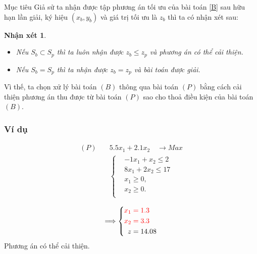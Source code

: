 \documentclass[12pt,a4paper]{report}
\newtheorem{nx}{Nhận xét}
\begin{document}
{Mục tiêu} %
Giả sử ta nhận được tập phương án tối ưu của bài toán \eqref{B} sau hữu hạn lần giải, ký hiệu $(x_b, y_b)$ và giá trị tối ưu là $z_b$ thì ta có nhận xét sau:
\begin{nx} \label{nx}
\phantom{abc}
\begin{itemize}
\item Nếu $S_b \subset S_p$ thì ta luôn nhận được $z_b \leq z_p$ và phương án có thể cải thiện.
\item Nếu $S_b = S_p$ thì ta nhận được $z_b = z_p$ và bài toán được giải.
\end{itemize}    
\end{nx}
Vì thế, ta chọn xử lý bài toán $(B)$ thông qua bài toán $(P)$ bằng cách cải thiện phương án thu được từ bài toán $(P)$ sao cho thoả điều kiện của bài toán $(B)$.


\subsubsection*{Ví dụ}
        \begin{equation*}
        \begin{split}
            (P) \quad & 5.5x_1 + 2.1x_2 \quad \longrightarrow Max \\
            & \left\{\begin{split}
            & -1x_1 + x_2 \leq 2 \\
            & 8x_1 + 2x_2 \leq 17 \\
            &x_1 \geq 0, \\
            &x_2 \geq 0. \\
            \end{split}\right. \\
        \end{split}
        \end{equation*}
        \begin{equation*}
            \Longrightarrow
            \left\{\begin{split}
            \color{red} x_1 &\color{red} = 1.3 \\
            \color{red} x_2 &\color{red} = 3.3 \\
            z&=14.08
        \end{split}\right.
        \end{equation*}
    Phương án có thể cải thiện.
\end{document}
